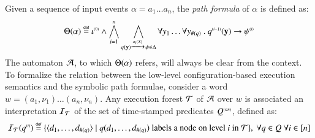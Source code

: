 Given a sequence of input events $\alpha = a_1 \ldots a_n$, the
\emph{path formula} of $\alpha$ is defined as:
\begin{equation}\label{eq:pathform}
\Theta({\alpha}) \stackrel{\scriptscriptstyle{\mathsf{def}}}{=} {\iota}^{\scriptscriptstyle{({0})}} \wedge 
\bigwedge_{i=1}^n \bigwedge_{q(\mathbf y) \xrightarrow{{\scriptscriptstyle a_i(X)}}_{{\scriptstyle }}
  \psi \in \Delta} \forall y_1 \ldots \forall y_{\#(q)} ~.~
{q}^{\scriptscriptstyle{({i-1})}}(\mathbf y) \rightarrow {\psi}^{\scriptscriptstyle{({i})}}
\end{equation}
The automaton $\mathcal{A}$, to which $\Theta({\alpha})$ refers, will always
be clear from the context. To formalize the relation between the
low-level configuration-based execution semantics and the symbolic
path formulae, consider a word $w=(a_1,\nu_1) \ldots (a_n,\nu_n)$. Any
execution forest $\mathcal{T}$ of $\mathcal{A}$ over $w$ is associated an interpretation
$\mathcal{I}_{\mathcal{T}}$ of the set of time-stamped predicates ${Q}^{\scriptscriptstyle{({\leq n})}}$,
defined as:
\[\mathcal{I}_{\mathcal{T}}({q}^{\scriptscriptstyle{({i})}}) \stackrel{\scriptscriptstyle{\mathsf{def}}}{=} \{ \langle d_1,\ldots,d_{\#(q)} \rangle \mid
  q(d_1,\ldots,d_{\#(q)}) \text{ labels a node on level $i$ in $\mathcal{T}$} \} 
,~\forall q\in Q ~\forall i \in [n]\]

